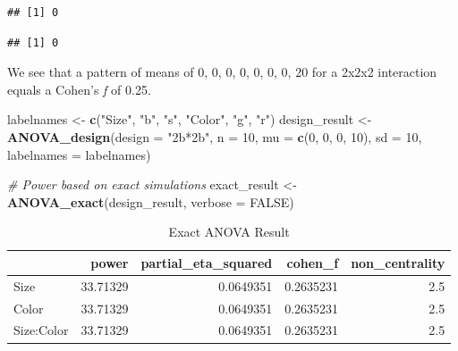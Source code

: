 \documentclass[
]{book}
\newenvironment{Shaded}{\begin{snugshade}}{\end{snugshade}}
\newcommand{\CommentTok}[1]{\textcolor[rgb]{0.56,0.35,0.01}{\textit{#1}}}
\newcommand{\DataTypeTok}[1]{\textcolor[rgb]{0.13,0.29,0.53}{#1}}
\newcommand{\DecValTok}[1]{\textcolor[rgb]{0.00,0.00,0.81}{#1}}
\newcommand{\KeywordTok}[1]{\textcolor[rgb]{0.13,0.29,0.53}{\textbf{#1}}}
\newcommand{\NormalTok}[1]{#1}
\newcommand{\OperatorTok}[1]{\textcolor[rgb]{0.81,0.36,0.00}{\textbf{#1}}}
\newcommand{\OtherTok}[1]{\textcolor[rgb]{0.56,0.35,0.01}{#1}}
\newcommand{\StringTok}[1]{\textcolor[rgb]{0.31,0.60,0.02}{#1}}
\begin{document}
\begin{Shaded}
\end{Shaded}

\begin{verbatim}
## [1] 0
\end{verbatim}

\begin{Shaded}
\end{Shaded}

\begin{verbatim}
## [1] 0
\end{verbatim}

We see that a pattern of means of 0, 0, 0, 0, 0, 0, 0, 20 for a 2x2x2 interaction equals a Cohen's \emph{f} of 0.25.

\begin{Shaded}
\begin{Highlighting}[]
\NormalTok{labelnames <-}\StringTok{ }\KeywordTok{c}\NormalTok{(}\StringTok{"Size"}\NormalTok{, }\StringTok{"b"}\NormalTok{, }\StringTok{"s"}\NormalTok{, }\StringTok{"Color"}\NormalTok{, }\StringTok{"g"}\NormalTok{, }\StringTok{"r"}\NormalTok{)}
\NormalTok{design_result <-}\StringTok{ }\KeywordTok{ANOVA_design}\NormalTok{(}\DataTypeTok{design =} \StringTok{"2b*2b"}\NormalTok{, }
                              \DataTypeTok{n =} \DecValTok{10}\NormalTok{, }
                              \DataTypeTok{mu =} \KeywordTok{c}\NormalTok{(}\DecValTok{0}\NormalTok{, }\DecValTok{0}\NormalTok{, }\DecValTok{0}\NormalTok{, }\DecValTok{10}\NormalTok{), }
                              \DataTypeTok{sd =} \DecValTok{10}\NormalTok{, }
                              \DataTypeTok{labelnames =}\NormalTok{ labelnames) }

\CommentTok{# Power based on exact simulations}
\NormalTok{exact_result <-}\StringTok{ }\KeywordTok{ANOVA_exact}\NormalTok{(design_result,}
                            \DataTypeTok{verbose =} \OtherTok{FALSE}\NormalTok{)}
\end{Highlighting}
\end{Shaded}

\begin{table}[!h]

\caption{\label{tab:unnamed-chunk-194}Exact ANOVA Result}
\centering
\begin{tabular}[t]{l|r|r|r|r}
\hline
  & power & partial\_eta\_squared & cohen\_f & non\_centrality\\
\hline
Size & 33.71329 & 0.0649351 & 0.2635231 & 2.5\\
\hline
Color & 33.71329 & 0.0649351 & 0.2635231 & 2.5\\
\hline
Size:Color & 33.71329 & 0.0649351 & 0.2635231 & 2.5\\
\hline
\end{tabular}
\end{table}
\end{document}
